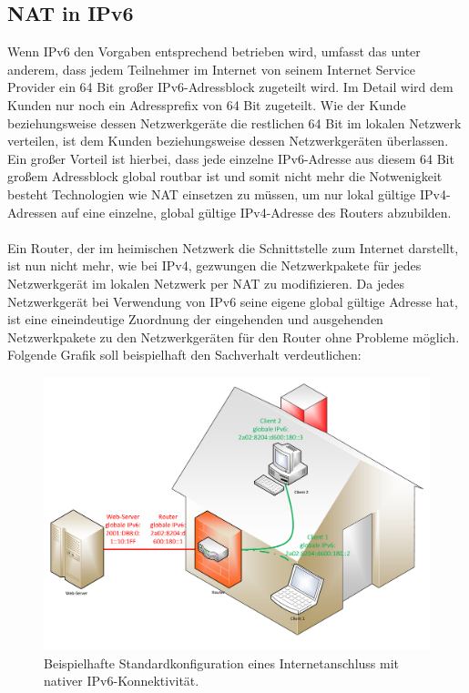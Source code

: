 \documentclass[a4paper,12pt]{scrartcl}
\begin{document}
\subsection{NAT in IPv6}
Wenn IPv6 den Vorgaben entsprechend betrieben wird, umfasst das unter anderem, dass jedem Teilnehmer im Internet von seinem Internet Service Provider ein 64 Bit gro{\ss}er  IPv6-Adressblock zugeteilt wird. Im Detail wird dem Kunden nur noch ein Adressprefix von 64 Bit zugeteilt. Wie der Kunde beziehungsweise dessen Netzwerkger\"ate die restlichen 64 Bit im lokalen Netzwerk verteilen, ist dem Kunden beziehungsweise dessen Netzwerkger\"aten  \"uberlassen. Ein gro{\ss}er Vorteil ist hierbei, dass jede einzelne IPv6-Adresse aus diesem 64 Bit gro{\ss}em Adressblock global routbar ist und somit nicht mehr die Notwenigkeit besteht Technologien wie NAT einsetzen zu m\"ussen, um nur lokal g\"ultige IPv4-Adressen auf eine einzelne, global g\"ultige IPv4-Adresse des Routers abzubilden.\\
\\

Ein Router, der im heimischen Netzwerk die Schnittstelle zum Internet darstellt, ist nun nicht mehr, wie bei IPv4, gezwungen die Netzwerkpakete f\"ur jedes Netzwerkger\"at im lokalen Netzwerk per NAT zu modifizieren. Da jedes Netzwerkger\"at bei Verwendung von IPv6 seine eigene global g\"ultige Adresse hat, ist eine eineindeutige Zuordnung der eingehenden und ausgehenden Netzwerkpakete zu den Netzwerkger\"aten f\"ur den Router ohne Probleme m\"oglich.  Folgende Grafik soll beispielhaft den Sachverhalt verdeutlichen:

\begin{figure}[htb]
\begin{center}
 \includegraphics[width=.8\hsize]{./Zeichnungen/IPv6.pdf}
 \end{center}
\caption[Beispielhafte Standardkonfiguration eines Internetanschluss mit nativer IPv6-Konnektivit\"at, Quelle: Autor, verwendete Symbole unterliegen der
GPL]{\label{stdinet}Beispielhafte Standardkonfiguration eines Internetanschluss mit nativer IPv6-Konnektivit\"at.}
\end{figure}
\end{document}
